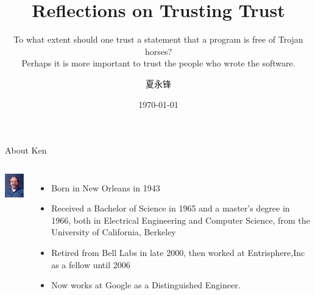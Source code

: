 \documentclass[CJK]{beamer}
\begin{document}
\begin{CJK*}{UTF8}{gbsn}

\title{Reflections on Trusting Trust}
\subtitle{\tiny To what extent should one trust a statement that a program is free of Trojan horses?\\ Perhaps it is more important to trust the people who wrote the software.}
\author{夏永锋}
\date{\today}

\begin{frame}
	\titlepage
\end{frame}

\begin{frame}{About Ken}
\begin{columns}
	\column{2cm}
	\includegraphics[width=2cm]{Ken.jpg}
	\column{9cm}
		\begin{itemize}
			
			\item Born in New Orleans in 1943
			\item Received a Bachelor of Science in 1965 and a master's degree in 1966, both in Electrical Engineering and Computer Science, from the University of California, Berkeley
			\item Retired from Bell Labs in late 2000, then worked at Entrisphere,Inc as a fellow until 2006
			\item Now works at Google as a Distinguished Engineer.
			

\end{itemize}
\end{columns}
\end{frame}
\end{CJK*}
\end{document}
